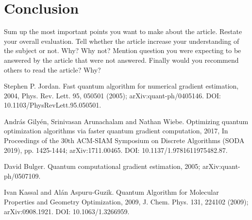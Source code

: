 \documentclass{article}
\begin{document}
\section{Conclusion}

Sum up the most important points you want to make about the article. Restate your overall evaluation. Tell whether the article increase your understanding of the subject or not. Why? Why not? Mention question you were expecting to be answered by the article that were not answered. Finally would you recommend others to read the article? Why?




%
%
\begin{thebibliography}{5}

  Stephen P. Jordan.
  \newblock Fast quantum algorithm for numerical gradient estimation, 2004,
  \newblock Phys. Rev. Lett. 95, 050501 (2005);
  \newblock arXiv:quant-ph/0405146.
  \newblock DOI: 10.1103/PhysRevLett.95.050501.

  András Gilyén, Srinivasan Arunachalam and Nathan Wiebe.
  \newblock Optimizing quantum optimization algorithms via faster quantum gradient computation, 2017,
  \newblock In Proceedings of the 30th ACM-SIAM Symposium on Discrete
  Algorithms (SODA 2019), pp. 1425-1444;
  \newblock arXiv:1711.00465.
  \newblock DOI: 10.1137/1.9781611975482.87.


  David Bulger.
  \newblock Quantum computational gradient estimation, 2005;
  \newblock arXiv:quant-ph/0507109.

  Ivan Kassal and Alán Aspuru-Guzik.
  \newblock Quantum Algorithm for Molecular Properties and Geometry Optimization, 2009,
  \newblock J. Chem. Phys. 131, 224102 (2009);
  \newblock arXiv:0908.1921.
  \newblock DOI: 10.1063/1.3266959.


\end{thebibliography}
\end{document}
